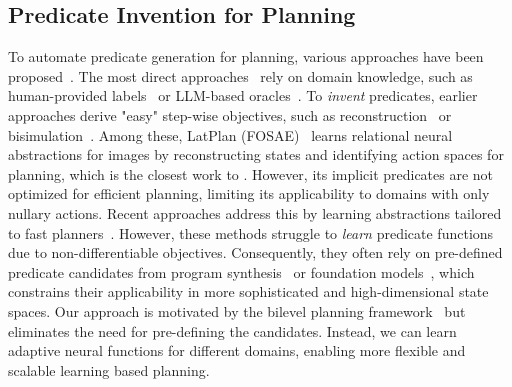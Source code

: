 \subsection{Predicate Invention for Planning}
To automate predicate generation for planning, various approaches have been proposed~\cite{liang2024visualpredicator,li2023embodied,han2024interpret,silver2023predicateinvent,asai2019latplan_fol,asai2021latplanpddl,asai2018latplan_prop,hansen2022bisimulation}. 
The most direct approaches~\cite{li2023embodied,han2024interpret} rely on domain knowledge, such as human-provided labels~\cite{li2023embodied} or LLM-based oracles~\cite{han2024interpret}. 
To \textit{invent} predicates, earlier approaches derive "easy" step-wise objectives, such as reconstruction~\cite{asai2018latplan_prop,asai2019latplan_fol,asai2021latplanpddl} or bisimulation~\cite{hansen2022bisimulation}.
Among these, LatPlan (FOSAE)~\cite{asai2019latplan_fol} learns relational neural abstractions for images by reconstructing states and identifying action spaces for planning, which is the closest work to \model{}. 
However, its implicit predicates are not optimized for efficient planning, limiting its applicability to domains with only nullary actions. 
Recent approaches\cite{silver2023predicateinvent,liang2024visualpredicator} address this by learning abstractions tailored to fast planners~\cite{helmert2006fast}. 
However, these methods struggle to \textit{learn} predicate functions due to non-differentiable objectives. 
Consequently, they often rely on pre-defined predicate candidates from program synthesis~\cite{silver2023predicateinvent} or foundation models~\cite{liang2024visualpredicator}, which constrains their applicability in more sophisticated and high-dimensional state spaces.
Our approach is motivated by the bilevel planning framework~\cite{silver2023predicateinvent} but eliminates the need for pre-defining the candidates. 
Instead, we can learn adaptive neural functions for different domains, enabling more flexible and scalable learning based planning.